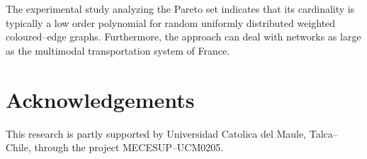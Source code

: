 \documentclass[preprint,authoryear,12pt]{elsarticle}
\begin{document}
The experimental study analyzing the Pareto set indicates that its
cardinality is typically a low order polynomial for random
uniformly distributed weighted coloured--edge graphs.
Furthermore, the approach can deal with networks as large as the
multimodal transportation system of France. 

\section*{Acknowledgements}
This research is partly supported by Universidad Catolica del Maule,
Talca--Chile, through the project MECESUP--UCM0205.


{}
\end{document}
